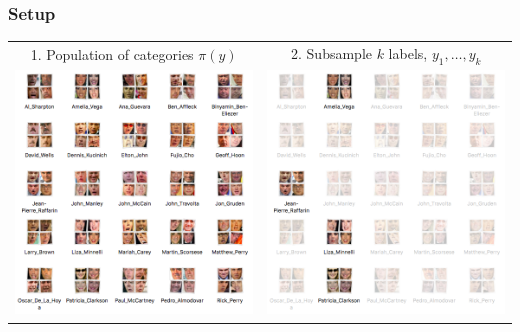 \documentclass{beamer}
\begin{document}
\begin{frame}
\frametitle{Setup}

\begin{center}
\begin{tabular}{c|c}
1. Population of categories $\pi(y)$ & 
2. Subsample $k$ labels, $y_1,\hdots, y_k$\\
\includegraphics[scale = 0.2]{photo_folders.png} &
\includegraphics[scale = 0.2]{photo_folders2.png}
\end{tabular}
\end{center}

\end{frame}
\end{document}
